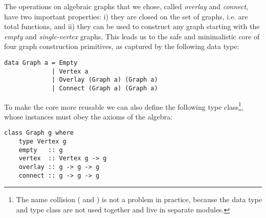 The operations on algebraic graphs that we chose, called \emph{overlay} and \emph{connect},
have two important properties: i) they are closed on the set of graphs, i.e. are total
functions, and ii) they can be used to construct any graph starting with the \emph{empty} and
\emph{single-vertex} graphs. This leads us to the safe and minimalistic core of four graph
construction primitives, as captured by the following data type:

\begin{verbatim}
data Graph a = Empty
             | Vertex a
             | Overlay (Graph a) (Graph a)
             | Connect (Graph a) (Graph a)
\end{verbatim}

\noindent
To make the core more reusable we can also define the following type class\footnote{The
name collision ( and ) is not a problem in practice,
because the data type and type class are not used together and live in
separate modules.}, whose instances must obey the axioms of the algebra:

\begin{verbatim}
class Graph g where
    type Vertex g
    empty   :: g
    vertex  :: Vertex g -> g
    overlay :: g -> g -> g
    connect :: g -> g -> g
\end{verbatim}

